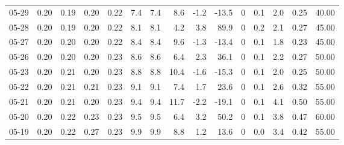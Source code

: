 \begin{threeparttable}
{\begin{tabular}{lrrrrrrrrrrrrrr}
  05-29 &          0.20 &          0.19 &          0.20 &        0.22 &                 7.4 &                7.4 &                 8.6 &       -1.2 &        -13.5 &              0 &                 0.1 &              2.0 &            0.25 &                  40.00 \\
  05-28 &          0.20 &          0.19 &          0.20 &        0.22 &                 8.1 &                8.1 &                 4.2 &        3.8 &         89.9 &              0 &                 0.2 &              2.1 &            0.27 &                  45.00 \\
  05-27 &          0.20 &          0.20 &          0.20 &        0.22 &                 8.4 &                8.4 &                 9.6 &       -1.3 &        -13.4 &              0 &                 0.1 &              1.8 &            0.23 &                  45.00 \\
  05-26 &          0.20 &          0.20 &          0.20 &        0.23 &                 8.6 &                8.6 &                 6.4 &        2.3 &         36.1 &              0 &                 0.1 &              2.2 &            0.27 &                  50.00 \\
  05-23 &          0.20 &          0.21 &          0.20 &        0.23 &                 8.8 &                8.8 &                10.4 &       -1.6 &        -15.3 &              0 &                 0.1 &              2.0 &            0.25 &                  50.00 \\
  05-22 &          0.20 &          0.21 &          0.21 &        0.23 &                 9.1 &                9.1 &                 7.4 &        1.7 &         23.6 &              0 &                 0.1 &              2.6 &            0.32 &                  55.00 \\
  05-21 &          0.20 &          0.21 &          0.20 &        0.23 &                 9.4 &                9.4 &                11.7 &       -2.2 &        -19.1 &              0 &                 0.1 &              4.1 &            0.50 &                  55.00 \\
  05-20 &          0.20 &          0.22 &          0.23 &        0.23 &                 9.5 &                9.5 &                 6.4 &        3.2 &         50.2 &              0 &                 0.1 &              3.8 &            0.47 &                  60.00 \\
  05-19 &          0.20 &          0.22 &          0.27 &        0.23 &                 9.9 &                9.9 &                 8.8 &        1.2 &         13.6 &              0 &                 0.0 &              3.4 &            0.42 &                  55.00 \\

\end{tabular}}
\end{threeparttable}
